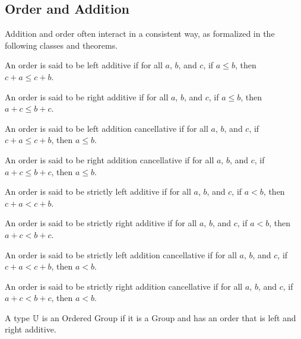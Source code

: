 \documentclass[../../math.tex]{subfiles}
\begin{document}
\subsection{Order and Addition}

Addition and order often interact in a consistent way, as formalized in the
following classes and theorems.

\begin{class}
    An order is said to be left additive if for all $a$, $b$, and $c$, if $a
    \leq b$, then $c + a \leq c + b$.
\end{class}

\begin{class}
    An order is said to be right additive if for all $a$, $b$, and $c$, if $a
    \leq b$, then $a + c \leq b + c$.
\end{class}

\begin{class}
    An order is said to be left addition cancellative if for all $a$, $b$, and
    $c$, if $c + a \leq c + b$, then $a \leq b$.
\end{class}

\begin{class}
    An order is said to be right addition cancellative if for all $a$, $b$, and
    $c$, if $a + c \leq b + c$, then $a \leq b$.
\end{class}

\begin{class}
    An order is said to be strictly left additive if for all $a$, $b$, and $c$,
    if $a < b$, then $c + a < c + b$.
\end{class}

\begin{class}
    An order is said to be strictly right additive if for all $a$, $b$, and $c$,
    if $a < b$, then $a + c < b + c$.
\end{class}

\begin{class}
    An order is said to be strictly left addition cancellative if for all $a$,
    $b$, and $c$, if $c + a < c + b$, then $a < b$.
\end{class}

\begin{class}
    An order is said to be strictly right addition cancellative if for all $a$,
    $b$, and $c$, if $a + c < b + c$, then $a < b$.
\end{class}

\begin{class}
    A type $\mathbb{U}$ is an Ordered Group if it is a Group and has an order that is
    left and right additive.
\end{class}
\end{document}
